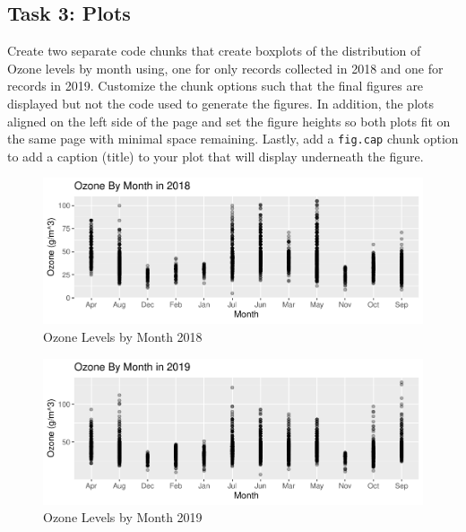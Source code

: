\documentclass[
]{article}
\begin{document}
\hypertarget{task-3-plots}{%
\subsection{Task 3: Plots}\label{task-3-plots}}

Create two separate code chunks that create boxplots of the distribution
of Ozone levels by month using, one for only records collected in 2018
and one for records in 2019. Customize the chunk options such that the
final figures are displayed but not the code used to generate the
figures. In addition, the plots aligned on the left side of the page and
set the figure heights so both plots fit on the same page with minimal
space remaining. Lastly, add a \texttt{fig.cap} chunk option to add a
caption (title) to your plot that will display underneath the figure.

\begin{figure}

\includegraphics{GriffinBird_A07_Lab_Crafting_Reports_files/figure-latex/Ozone2018-1} \hfill{}

\caption{Ozone Levels by Month 2018}\label{fig:Ozone2018}
\end{figure}
\begin{figure}

\hfill{}\includegraphics{GriffinBird_A07_Lab_Crafting_Reports_files/figure-latex/Ozone2019-1} 

\caption{Ozone Levels by Month 2019}\label{fig:Ozone2019}
\end{figure}
\end{document}
